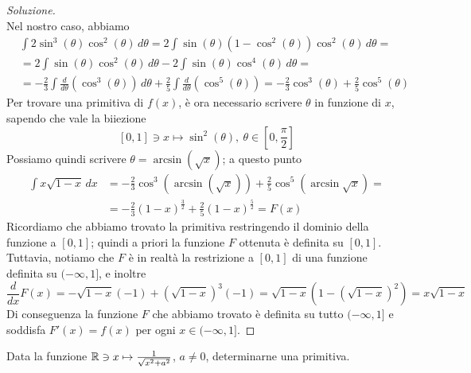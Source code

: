\begin{proof}[Soluzione]
\[    \]
    Nel nostro caso, abbiamo 
    \[
    \begin{split}
        & \int 2\sin^3(\theta)\cos^2(\theta)\, d\theta = 2\int \sin(\theta)(1-\cos^2(\theta))\cos^2(\theta)\, d\theta = \\
        & = 2\int \sin(\theta)\cos^2(\theta)\, d\theta - 2\int \sin(\theta)\cos^4(\theta)\, d\theta = \\
        & = -\frac{2}{3}\int \frac{d}{d\theta}(\cos^3(\theta))\, d\theta +\frac{2}{5} \int \frac{d}{d\theta}(\cos^5(\theta)) = -\frac{2}{3}\cos^3(\theta) + \frac{2}{5}\cos^5(\theta)
    \end{split}
    \]
    Per trovare una primitiva di $f(x)$, è ora necessario scrivere $\theta$ in funzione di $x$, sapendo che vale la biiezione
    \[
    [0,1]\ni x \mapsto \sin^2(\theta), \ \theta\in\left[0,\frac{\pi}{2}\right] 
    \]
    Possiamo quindi scrivere $\theta=\arcsin(\sqrt{x})$; a questo punto
    \[
    \begin{split}
        \int x\sqrt{1-x}\, dx & = -\frac{2}{3}\cos^3(\arcsin(\sqrt{x}))+\frac{2}{5}\cos^5(\arcsin{\sqrt{x}}) = \\
        & = -\frac{2}{3}(1-x)^{\frac{3}{2}}+\frac{2}{5}(1-x)^{\frac{5}{2}} = F(x)
    \end{split}
    \]
    Ricordiamo che abbiamo trovato la primitiva restringendo il dominio della funzione a $[0,1]$; quindi a priori la funzione $F$ ottenuta è definita su $[0,1]$. Tuttavia, notiamo che $F$ è in realtà la restrizione a $[0,1]$ di una funzione definita su $(-\infty, 1]$, e inoltre
    \[
    \frac{d}{dx}F(x) = -\sqrt{1-x}(-1)+(\sqrt{1-x})^3(-1) = \sqrt{1-x}\left(1-(\sqrt{1-x})^2\right) = x\sqrt{1-x}
    \]
    Di conseguenza la funzione $F$ che abbiamo trovato è definita su tutto $(-\infty, 1]$ e soddisfa $F'(x) = f(x)$ per ogni $x\in(-\infty, 1]$.
\end{proof}
\begin{exercise}
    \label{ex:8.3}
    Data la funzione $\amsbb{R}\ni x \mapsto \frac{1}{\sqrt{x^2+a^2}}$, $a\ne 0$, determinarne una primitiva.
\end{exercise}
